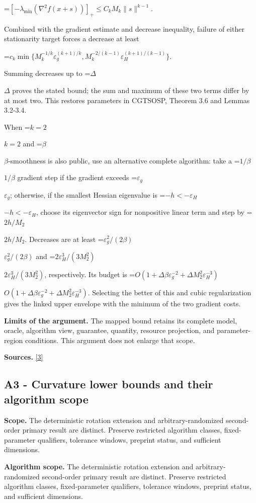 \documentclass[10pt,a4paper]{article}
\newcommand{\AtlasMath}[1]{\par\begingroup\centering\setbox0=\hbox{$\displaystyle #1$}\ifdim\wd0>1.4\linewidth\typeout{ATLAS WIDE FORMULA: \the\wd0}\fi\ifdim\wd0>\linewidth\resizebox{\linewidth}{!}{\box0}\else\box0\fi\par\endgroup}
\newcommand{\AtlasInlineMath}[1]{\begingroup\setbox0=\hbox{$#1$}\ifdim\wd0>.4\linewidth\endgroup\AtlasMath{#1}\else\endgroup$#1$\fi}
\begin{document}
\AtlasMath{[-\lambda_{\min}(\nabla^2f(x+s))]_+\le C_kM_k\|s\|^{k-1}.}

Combined with the gradient estimate and decrease inequality, failure of either stationarity target forces a decrease at least

\AtlasMath{c_k\min\{M_k^{-1/k}\varepsilon_g^{(k+1)/k},M_k^{-2/(k-1)}\varepsilon_H^{(k+1)/(k-1)}\}.}

Summing decreases up to \AtlasInlineMath{\Delta} proves the stated bound; the sum and maximum of these two terms differ by at most two. This restores parameters in CGTSOSP, Theorem 3.6 and Lemmas 3.2-3.4.

When \AtlasInlineMath{k=2} and \AtlasInlineMath{\beta}-smoothness is also public, use an alternative complete algorithm: take a \AtlasInlineMath{1/\beta} gradient step if the gradient exceeds \AtlasInlineMath{\varepsilon_g}; otherwise, if the smallest Hessian eigenvalue is \AtlasInlineMath{-h<-\varepsilon_H}, choose its eigenvector sign for nonpositive linear term and step by \AtlasInlineMath{2h/M_2}. Decreases are at least \AtlasInlineMath{\varepsilon_g^2/(2\beta)} and \AtlasInlineMath{2\varepsilon_H^3/(3M_2^2)}, respectively. Its budget is \AtlasInlineMath{O(1+\Delta\beta\varepsilon_g^{-2}+\Delta M_2^2\varepsilon_H^{-3})}. Selecting the better of this and cubic regularization gives the linked upper envelope with the minimum of the two gradient costs.

\textbf{Limits of the argument.} The mapped bound retains its complete model, oracle, algorithm view, guarantee, quantity, resource projection, and parameter-region conditions. This argument does not enlarge that scope.

\textbf{Sources.} \href{https://arxiv.org/abs/1708.04044}{[3]}

\subsection{A3 - Curvature lower bounds and their algorithm scope}
\textbf{Scope.} The deterministic rotation extension and arbitrary-randomized second-order primary result are distinct. Preserve restricted algorithm classes, fixed-parameter qualifiers, tolerance windows, preprint status, and sufficient dimensions.

\textbf{Algorithm scope.} The deterministic rotation extension and arbitrary-randomized second-order primary result are distinct. Preserve restricted algorithm classes, fixed-parameter qualifiers, tolerance windows, preprint status, and sufficient dimensions.
\end{document}
